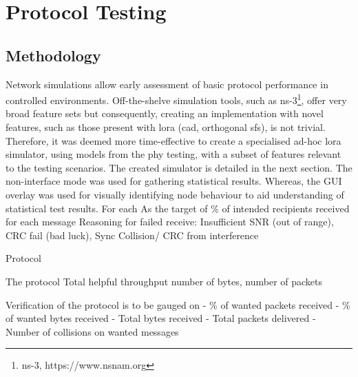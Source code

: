 \chapter{Protocol Testing}
\section{Methodology}
Network simulations allow early assessment of basic protocol performance in controlled environments. Off-the-shelve simulation tools, such as ns-3\footnote{ns-3, https://www.nsnam.org}, offer very broad feature sets but consequently, creating an implementation with novel features, such as those present with \ac{lora} (\ac{cad}, orthogonal \ac{sf}s), is not trivial. Therefore, it was deemed more time-effective to create a specialised ad-hoc \ac{lora} simulator, using models from the \ac{phy} testing, with a subset of features relevant to the testing scenarios. The created simulator is detailed in the next section. The non-interface mode was used for gathering statistical results. Whereas, the GUI overlay was used for visually identifying node behaviour to aid understanding of statistical test results.
For each 
As the target of 
\% of intended recipients received for each message
Reasoning for failed receive: Insufficient SNR (out of range), CRC fail (bad luck), Sync Collision/ CRC from interference

Protocol 

The protocol 
Total helpful throughput number of bytes,  number of packets




Verification of the protocol is to be gauged on 
 - \% of wanted packets received
 - \% of wanted bytes received
 - Total bytes received
 - Total packets delivered
 - Number of collisions on wanted messages






